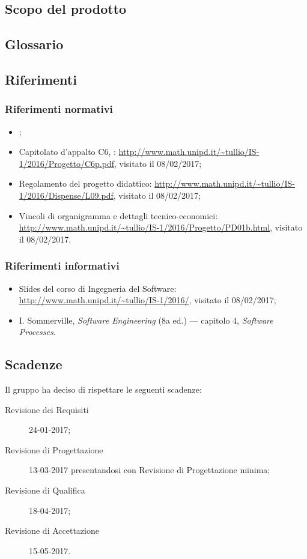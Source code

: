 \subsection{Scopo del prodotto}
\scopo

\subsection{Glossario}
\presgloss

\subsection{Riferimenti}
\subsubsection{Riferimenti normativi}
\begin{itemize}
	\item \NdP;
	\item Capitolato d'appalto C6, \proj: \url{http://www.math.unipd.it/~tullio/IS-1/2016/Progetto/C6p.pdf}, visitato il 08/02/2017;
	\item Regolamento del progetto didattico: \url{http://www.math.unipd.it/~tullio/IS-1/2016/Dispense/L09.pdf}, visitato il 08/02/2017;
	\item Vincoli di organigramma e dettagli tecnico-economici: \url{http://www.math.unipd.it/~tullio/IS-1/2016/Progetto/PD01b.html}, visitato il 08/02/2017.
\end{itemize}
\subsubsection{Riferimenti informativi} \label{sec:ref}
\begin{itemize}
	\item Slides del corso di Ingegneria del Software: \url{http://www.math.unipd.it/~tullio/IS-1/2016/}, visitato il 08/02/2017;
	\item I. Sommerville, \emph{Software Engineering} (8a ed.) --- capitolo 4, \emph{Software Processes}.
\end{itemize}

\subsection{Scadenze}
Il gruppo \hx{} ha deciso di rispettare le seguenti scadenze:
\begin{description}
	\item[Revisione dei Requisiti] 24-01-2017;
	\item[Revisione di Progettazione] 13-03-2017 presentandosi con Revisione di Progettazione minima;
	\item[Revisione di Qualifica] 18-04-2017;
	\item[Revisione di Accettazione] 15-05-2017.
\end{description}





